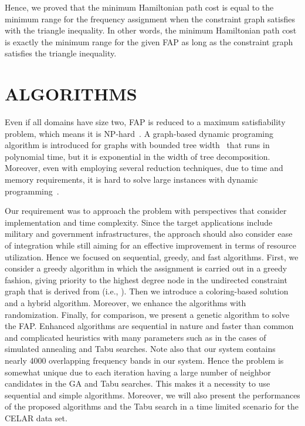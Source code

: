 \documentclass[10pt,twocolumn,twoside]{JCNtran}
\newcommand{\tbirkan}[1]{#1}
\begin{document}
Hence, we proved that the minimum Hamiltonian path cost \tbirkan{is equal to the minimum} range for the frequency assignment when the constraint graph satisfies with the triangle inequality. \tbirkan{In other words, the minimum Hamiltonian path cost is exactly the minimum range for the given FAP as long as the constraint graph satisfies the triangle inequality.} 




\section{\uppercase{Algorithms}}
\label{sec_algorithms}
Even if all domains have size two, FAP is reduced to a maximum satisfiability problem, which means it is NP-hard~\cite{koster1998partialCS}. A graph-based dynamic programing algorithm is introduced for graphs with bounded tree width~\cite{koster1999optimalSF} that runs in polynomial time, but it is exponential in the width of tree decomposition. Moreover, even with employing several reduction techniques, due to time and memory requirements, it is hard to solve large instances with dynamic programming~\cite{koster1999optimalSF}.

\tbirkan{Our requirement was to approach the problem with perspectives that consider implementation and time complexity. Since the target applications include military and government infrastructures, the approach should also consider ease of integration while still aiming for an effective improvement in terms of resource utilization. Hence we focused on sequential, greedy, and fast algorithms.} First, we consider a greedy algorithm in which the assignment is carried out in a greedy fashion, giving priority to the highest degree node in the undirected constraint graph that is derived from  (i.e., ). Then we introduce a coloring-based solution and a hybrid algorithm. Moreover, we enhance the algorithms with randomization. Finally, for comparison, we present a genetic algorithm to solve the FAP. \tbirkan{Enhanced algorithms are sequential in nature and faster than common and complicated heuristics with many parameters such as in the cases of simulated annealing and Tabu searches. Note also that our system contains nearly 4000 overlapping frequency bands in our system. Hence the problem is somewhat unique due to each iteration having a large number of neighbor candidates in the GA and Tabu searches. This makes it a necessity to use sequential and simple algorithms. Moreover, we will also present the performances of the proposed algorithms and the Tabu search in a time limited scenario for the CELAR data set. }
\end{document}
